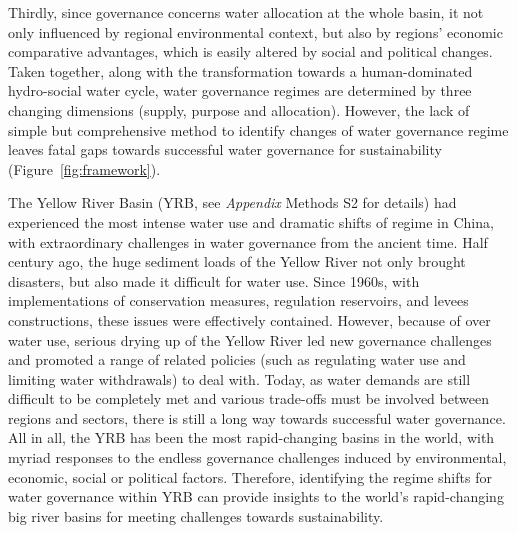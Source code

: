 \documentclass[9pt, twocolumn, twoside, lineno]{pnas-new}
\begin{document}
Thirdly, since governance concerns water allocation at the whole basin, it not only influenced by regional environmental context, but also by regions' economic comparative advantages, which is easily altered by social and political changes.
Taken together, along with the transformation towards a human-dominated hydro-social water cycle, water governance regimes are determined by three changing dimensions (supply, purpose and allocation). However, the lack of simple but comprehensive method to identify changes of water governance regime leaves fatal gaps towards successful water governance for sustainability (Figure~\ref{fig:framework}).

\label{introduction-section-3}
The Yellow River Basin (YRB, see \textit{Appendix} Methods S2 for details) had experienced the most intense water use and dramatic shifts of regime in China, with extraordinary challenges in water governance from the ancient time.
Half century ago, the huge sediment loads of the Yellow River not only brought disasters, but also made it difficult for water use. 
Since 1960s, with implementations of conservation measures, regulation reservoirs, and levees constructions, these issues were effectively contained.
However, because of over water use, serious drying up of the Yellow River led new governance challenges and promoted a range of related policies (such as regulating water use and limiting water withdrawals) to deal with.
Today, as water demands are still difficult to be completely met and various trade-offs must be involved between regions and sectors, there is still a long way towards successful water governance.
All in all, the YRB has been the most rapid-changing basins in the world, with myriad responses to the endless governance challenges induced by environmental, economic, social or political factors.
Therefore, identifying the regime shifts for water governance within YRB can provide insights to the world's rapid-changing big river basins for meeting challenges towards sustainability.
\end{document}
